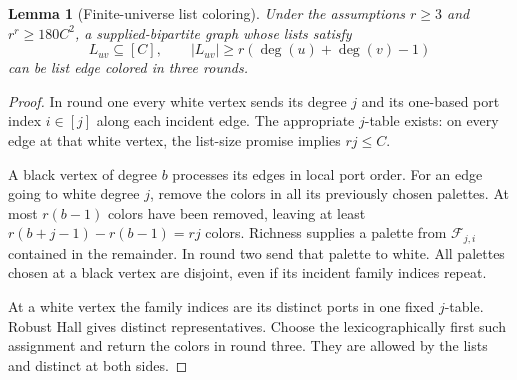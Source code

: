 \documentclass[11pt]{article}
\newtheorem{lemma}[theorem]{Lemma}
\theoremstyle{definition}
\theoremstyle{remark}
\newcommand{\F}{\mathcal F}
\newcommand{\abs}[1]{\left|#1\right|}
\begin{document}
\begin{lemma}[Finite-universe list coloring]\label{lem:finiteuniverse}
Under the assumptions $r\ge3$ and $r^r\ge180C^2$, a supplied-bipartite
graph whose lists satisfy
\[
 L_{uv}\subseteq[C],\qquad
 \abs{L_{uv}}\ge r(\deg(u)+\deg(v)-1)
\]
can be list edge colored in three rounds.
\end{lemma}
\begin{proof}
In round one every white vertex sends its degree $j$ and its one-based port
index $i\in[j]$ along each incident edge. The appropriate $j$-table
exists: on every edge at that white vertex, the list-size promise
implies $rj\le C$.

A black vertex of degree $b$ processes its edges in local port order.
For an edge going to white degree $j$, remove the colors in all its
previously chosen palettes. At most $r(b-1)$ colors have been removed,
leaving at least
$r(b+j-1)-r(b-1)=rj$ colors. Richness supplies a palette from
$\F_{j,i}$ contained in the remainder. In round two send that palette
to white. All palettes chosen at a black vertex are disjoint, even if
its incident family indices repeat.

At a white vertex the family indices are its distinct ports in one
fixed $j$-table. Robust Hall gives distinct representatives. Choose
the lexicographically first such assignment and return the colors in
round three. They are allowed by the lists and distinct at both sides.
\end{proof}
\end{document}
